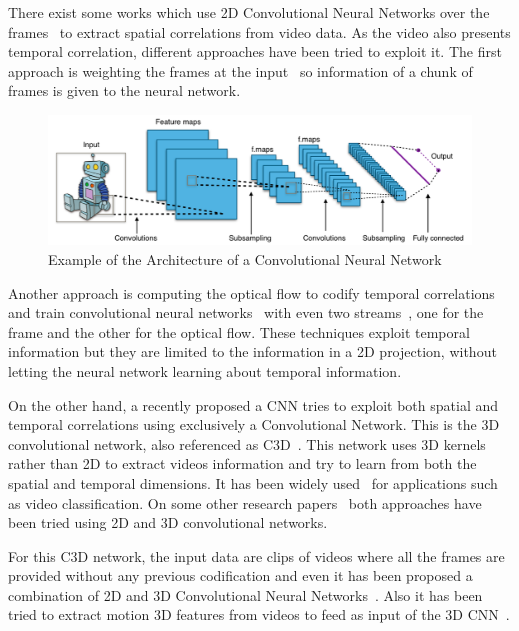 There exist some works which use 2D Convolutional Neural Networks over the frames~\cite{gkioxari2015contextual,yeung2015end,ballas2015delving} to extract spatial correlations from video data. As the video also presents temporal correlation, different approaches have been tried to exploit it. The first approach is weighting the frames at the input~\cite{yeung2015every} so information of a chunk of frames is given to the neural network.

\begin{figure}[ht]
\begin{center}
\includegraphics[width=1\linewidth]{img/stateofart/cnn_architecture}
\end{center}
\caption{Example of the Architecture of a Convolutional Neural Network}
\label{fig:cnn_architecture}
\end{figure}

Another approach is computing the optical flow to codify temporal correlations and train convolutional neural networks~\cite{simonyan2014two,Ng_2015_CVPR} with even two streams~\cite{wang2015towards}, one for the frame and the other for the optical flow. These techniques exploit temporal information but they are limited to the information in a 2D projection, without letting the neural network learning about temporal information.

On the other hand, a recently proposed a CNN tries to exploit both spatial and temporal correlations using exclusively a Convolutional Network. This is the 3D convolutional network, also referenced as C3D~\cite{tran2014learning}. This network uses 3D kernels rather than 2D to extract videos information and try to learn from both the spatial and temporal dimensions. It has been widely used~\cite{baccouche2011sequential,tran2015deep,tran2014learning,shoutemporal} for applications such as video classification. On some other research papers~\cite{yao2015describing,zhang2016modelling} both approaches have been tried using 2D and 3D convolutional networks.

For this C3D network, the input data are clips of videos where all the frames are provided without any previous codification and even it has been proposed a combination of 2D and 3D Convolutional Neural Networks~\cite{Ng_2015_CVPR,yao2015describing}. Also it has been tried to extract motion 3D features from videos to feed as input of the 3D CNN~\cite{yao2015describing}.

